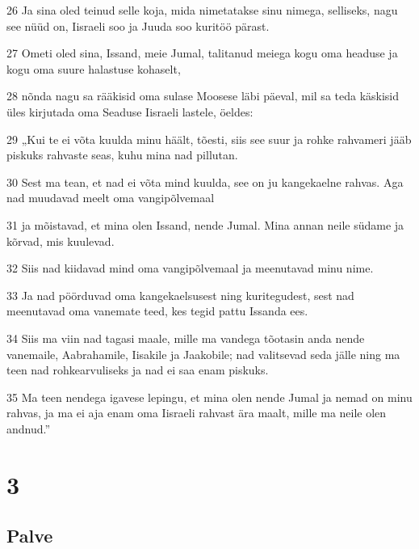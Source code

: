 \par 26 Ja sina oled teinud selle koja, mida nimetatakse sinu nimega, selliseks, nagu see nüüd on, Iisraeli soo ja Juuda soo kuritöö pärast.
\par 27 Ometi oled sina, Issand, meie Jumal, talitanud meiega kogu oma headuse ja kogu oma suure halastuse kohaselt,
\par 28 nõnda nagu sa rääkisid oma sulase Moosese läbi päeval, mil sa teda käskisid üles kirjutada oma Seaduse Iisraeli lastele, öeldes:
\par 29 „Kui te ei võta kuulda minu häält, tõesti, siis see suur ja rohke rahvameri jääb piskuks rahvaste seas, kuhu mina nad pillutan.
\par 30 Sest ma tean, et nad ei võta mind kuulda, see on ju kangekaelne rahvas. Aga nad muudavad meelt oma vangipõlvemaal
\par 31 ja mõistavad, et mina olen Issand, nende Jumal. Mina annan neile südame ja kõrvad, mis kuulevad.
\par 32 Siis nad kiidavad mind oma vangipõlvemaal ja meenutavad minu nime.
\par 33 Ja nad pöörduvad oma kangekaelsusest ning kuritegudest, sest nad meenutavad oma vanemate teed, kes tegid pattu Issanda ees.
\par 34 Siis ma viin nad tagasi maale, mille ma vandega tõotasin anda nende vanemaile, Aabrahamile, Iisakile ja Jaakobile; nad valitsevad seda jälle ning ma teen nad rohkearvuliseks ja nad ei saa enam piskuks.
\par 35 Ma teen nendega igavese lepingu, et mina olen nende Jumal ja nemad on minu rahvas, ja ma ei aja enam oma Iisraeli rahvast ära maalt, mille ma neile olen andnud.”

\chapter{3}

\section*{Palve}

